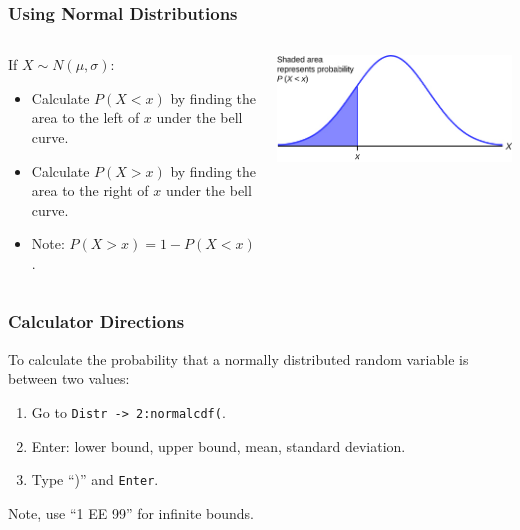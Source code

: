 \documentclass[12pt,twocolumn]{article}
\begin{document}
\begin{frame}[t]
 \frametitle{Using Normal Distributions}
 \begin{columns}
  \begin{column}{0.5\textwidth}
    If $X \sim N(\mu, \sigma)$:
    \begin{itemize}
     \item Calculate $P(X < x)$ by finding the area to the left of $x$ under the bell curve.
     \item Calculate $P(X > x)$ by finding the area to the right of $x$ under the bell curve.
     \item Note: $P(X > x) = 1 - P(X < x)$.
    \end{itemize}
  \end{column}
  \begin{column}{0.5\textwidth}
    \includegraphics[width=\linewidth]{area_normal_distribution.jpg}
  \end{column}
 \end{columns}
\end{frame}

\begin{frame}[t]
 \frametitle{Calculator Directions}
 To calculate the probability that a normally distributed random variable is between two values:
 \begin{enumerate}
  \item Go to \texttt{Distr -> 2:normalcdf(}.
  \item Enter: lower bound, upper bound, mean, standard deviation.
  \item Type ``)'' and \texttt{Enter}.
 \end{enumerate}
 Note, use ``1 EE 99'' for infinite bounds.

\end{frame}
\end{document}
